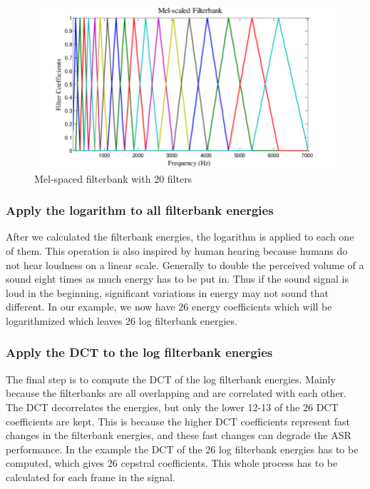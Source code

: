 \begin{figure}[htbp]
	\centering
	\includegraphics[scale=0.4]{baa-documentation/img/Mel-filter-banks-basis-functions-using-20-Mel-filters-in-the-filter-bank.png}
	\caption[Mel-spaced filterbank with 20 filters]{Mel-spaced filterbank with 20 filters \footnotemark}
	\label{fig:MFCC-Mel-Filterbank}
\end{figure}

\subsubsection{Apply the logarithm to all filterbank energies}
After we calculated the filterbank energies, the logarithm is applied to each one of them. This operation is also inspired by human hearing because humans do not hear loudness on a linear scale. Generally to double the perceived volume of a sound eight times as much energy has to be put in. Thus if the sound signal is loud in the beginning, significant variations in energy may not sound that different.
\newline
\newline
In our example, we now have 26 energy coefficients which will be logarithmized which leaves 26 log filterbank energies.

\subsubsection{Apply the \gls{DCT} to the log filterbank energies}
The final step is to compute the \gls{DCT} of the log filterbank energies. Mainly because the filterbanks are all overlapping and are correlated with each other. The \gls{DCT} decorrelates the energies, but only the lower 12-13 of the 26 \gls{DCT} coefficients are kept. This is because the higher \gls{DCT} coefficients represent fast changes in the filterbank energies, and these fast changes can degrade the \gls{ASR} performance.
\newline
\newline
In the example the \gls{DCT} of the 26 log filterbank energies has to be computed, which gives 26 cepstral coefficients. This whole process has to be calculated for each frame in the signal.

